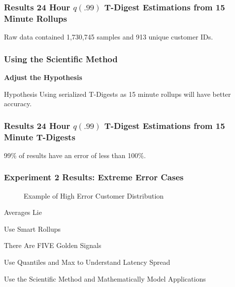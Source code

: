 \begin{frame}
    \frametitle{Results 24 Hour $q(.99)$ T-Digest Estimations from 15 Minute Rollups}
    Raw data contained 1,730,745 samples and 913 unique customer IDs.

    
\end{frame}

\begin{frame}
    \frametitle{Using the Scientific Method}
    \begin{center}
        \textbf{Adjust the Hypothesis} 
    \end{center}
    \vskip 1cm
    \begin{block}{Hypothesis}
    Using serialized T-Digests as 15 minute rollups will have better accuracy.
    \end{block}
\end{frame}



\begin{frame}
    \frametitle{Results 24 Hour $q(.99)$ T-Digest Estimations from 15 Minute T-Digests}
    99\% of results have an error of less than 100\%.
\end{frame}

\begin{frame}
    \frametitle{Experiment 2 Results: Extreme Error Cases}
    \begin{figure}[!h]
        \centering
        
        \caption{Example of High Error Customer Distribution}
    \end{figure}
\end{frame}

\begin{frame}[standout]
    \small

    Averages Lie

    Use Smart Rollups

    There Are FIVE Golden Signals

    Use Quantiles and Max to Understand Latency Spread

    Use the Scientific Method and Mathematically Model Applications
\end{frame}

